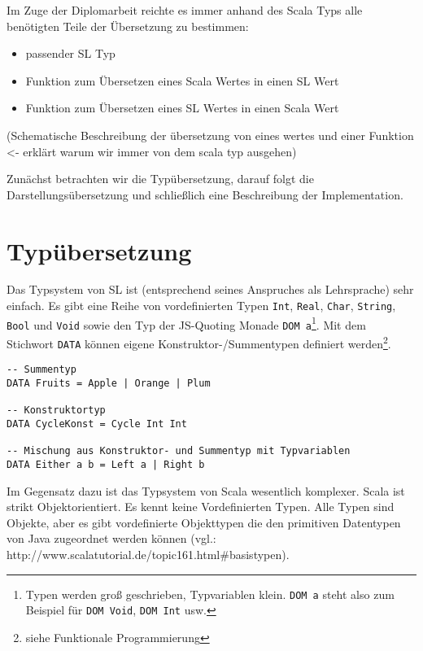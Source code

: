 \documentclass[12pt]{scrreprt}
\begin{document}
Im Zuge der Diplomarbeit reichte es immer anhand des Scala Typs alle benötigten Teile der Übersetzung zu bestimmen:
\begin{itemize}
\item passender \ac{SL} Typ
\item Funktion zum Übersetzen eines Scala Wertes in einen \ac{SL} Wert
\item Funktion zum Übersetzen eines \ac{SL} Wertes in einen Scala Wert
\end{itemize}

(Schematische Beschreibung der übersetzung von eines wertes und einer Funktion <- erklärt warum wir immer von dem scala typ ausgehen)

Zunächst betrachten wir die Typübersetzung, darauf folgt die Darstellungsübersetzung und schließlich eine Beschreibung der Implementation.

\section{Typübersetzung}

Das Typsystem von \ac{SL} ist (entsprechend seines Anspruches als Lehrsprache) sehr einfach. Es gibt eine Reihe von vordefinierten Typen \lstinline!Int!, \lstinline!Real!, \lstinline!Char!, \lstinline!String!, \lstinline!Bool! und \lstinline!Void! sowie den Typ der \ac{JS}-Quoting Monade \lstinline!DOM a!\footnote{Typen werden groß geschrieben, Typvariablen klein. \lstinline!DOM a! steht also zum Beispiel für \lstinline!DOM Void!, \lstinline!DOM Int! usw.}. Mit dem Stichwort \lstinline!DATA! können eigene Konstruktor-/Summentypen definiert werden\footnote{siehe Funktionale Programmierung}.

\begin{lstlisting}[caption=Beispiele für selbstdefinierte Datentypen in \ac{SL}, label=lst:bsp2]
-- Summentyp
DATA Fruits = Apple | Orange | Plum

-- Konstruktortyp
DATA CycleKonst = Cycle Int Int

-- Mischung aus Konstruktor- und Summentyp mit Typvariablen
DATA Either a b = Left a | Right b
\end{lstlisting}

Im Gegensatz dazu ist das Typsystem von Scala wesentlich komplexer. Scala ist strikt Objektorientiert. Es kennt keine Vordefinierten Typen. Alle Typen sind Objekte, aber es gibt vordefinierte Objekttypen die den primitiven Datentypen von Java zugeordnet werden können (vgl.: http://www.scalatutorial.de/topic161.html\#basistypen).
\end{document}

